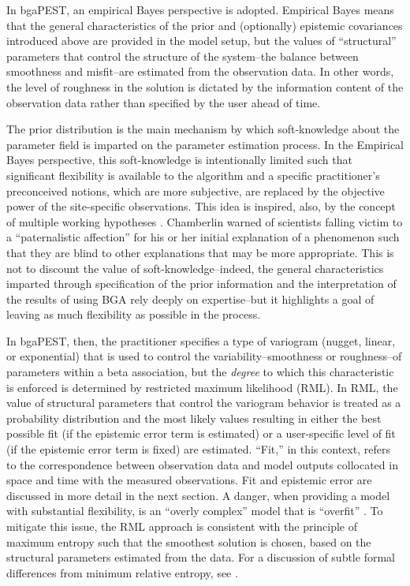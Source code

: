 \documentclass[11pt,oneside,onecolumn]{usgsreport}
\begin{document}
\begin{multicols}{2}
In bgaPEST, an empirical Bayes \citep{Robbins1956,casella1985} perspective
is adopted. Empirical Bayes means that the general characteristics
of the prior and (optionally) epistemic covariances introduced above
are provided in the model setup, but the values of ``structural''
parameters that control the structure of the system--the balance between
smoothness and misfit--are estimated from the observation data. In
other words, the level of roughness in the solution is dictated by
the information content of the observation data rather than specified
by the user ahead of time. 

The prior distribution is the main mechanism by which soft-knowledge
about the parameter field is imparted on the parameter estimation
process. In the Empirical Bayes perspective, this soft-knowledge is
intentionally limited such that significant flexibility is available
to the algorithm and a specific practitioner's preconceived notions,
which are more subjective, are replaced by the objective power of
the site-specific observations. This idea is inspired, also, by the
concept of multiple working hypotheses \citep{Chamberlin1890}. Chamberlin
warned of scientists falling victim to a ``paternalistic affection''
for his or her initial explanation of a phenomenon such that they
are blind to other explanations that may be more appropriate. This
is not to discount the value of soft-knowledge--indeed, the general
characteristics imparted through specification of the prior information
and the interpretation of the results of using BGA rely deeply on
expertise--but it highlights a goal of leaving as much flexibility
as possible in the process. 

In bgaPEST, then, the practitioner specifies a type of variogram (nugget,
linear, or exponential) that is used to control the variability--smoothness
or roughness--of parameters within a beta association, but the \emph{degree}
to which this characteristic is enforced is determined by restricted
maximum likelihood (RML). In RML, the value of structural parameters
that control the variogram behavior is treated as a probability distribution
and the most likely values resulting in either the best possible fit
(if the epistemic error term is estimated) or a user-specific level
of fit (if the epistemic error term is fixed) are estimated. ``Fit,''
in this context, refers to the correspondence between observation
data and model outputs collocated in space and time with the measured
observations. Fit and epistemic error are discussed in more detail
in the next section. A danger, when providing a model with substantial
flexibility, is an ``overly complex'' model that is ``overfit''
\citep[e.g. ][]{drapersmith66,Hill2006}. To mitigate this issue,
the RML approach is consistent with the principle of maximum entropy
such that the smoothest solution is chosen, based on the structural
parameters estimated from the data. For a discussion of subtle formal
differences from minimum relative entropy, see \citet[p. 333-342]{Rubin2003}.


\end{multicols}
\end{document}
